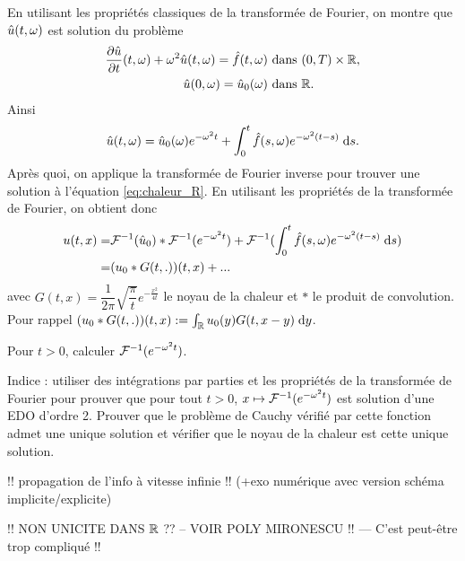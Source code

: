 \documentclass[12pt,a4paper,twoside]{article}
\begin{document}
En utilisant les propri\'et\'es classiques de la transform\'ee de Fourier,
on montre que $\hat u(t,\omega)$ est solution du probl\`eme
\begin{align*}
  \dfrac{\partial \hat u}{\partial t}(t,\omega) + \omega^2 \hat u(t , \omega) = \hat f(t,\omega) 
  & \text{ dans } (0,T) \times \mathbb{R} ,
  \\
  \hat u(0 , \omega) = \hat u_0(\omega)
  & \text{ dans } \mathbb{R} .
\end{align*}
Ainsi 
\begin{align*}
  \hat u(t,\omega) = \hat u_0(\omega) e^{- \omega^2 t} 
  + \int_0^t \hat f(s,\omega) e^{- \omega^2 (t - s)} \;\mathrm{d} s . 
\end{align*}
Apr\`es quoi, on applique la transform\'ee de Fourier inverse pour trouver
une solution \`a l'\'equation \eqref{eq:chaleur_R}.
En utilisant les propri\'et\'es de la transform\'ee de Fourier, on obtient donc
\begin{align*}
  u(t,x) 
  =& \mathcal{F}^{-1}(\hat u_0) * \mathcal{F}^{-1} (e^{-\omega^2 t})
  + \mathcal{F}^{-1} (\int_0^t \hat f(s,\omega) e^{- \omega^2(t-s)} \;\mathrm{d} s)
  \\
  =& (u_0 * G(t,.))(t,x) + ...
\end{align*}
avec $G(t,x) = \dfrac{1}{2 \pi} \sqrt{\dfrac{\pi}{t}} e^{- \frac{x^2}{4t}}$
le noyau de la chaleur et $*$ le produit de convolution.
Pour rappel
$(u_0 * G(t,.))(t,x) := \int_{\mathbb{R}} u_0(y) G(t,x-y) \;\mathrm{d} y$.

\begin{exercise}
  Pour $t > 0$, calculer $\mathcal{F}^{-1}(e^{-\omega^2 t})$.

  Indice : utiliser des int\'egrations par parties et les propri\'et\'es de la transform\'ee
  de Fourier pour prouver que pour tout $t > 0$, $x \mapsto \mathcal{F}^{-1}(e^{-\omega^2 t})$ est solution
  d'une EDO d'ordre 2.
  Prouver que le probl\`eme de Cauchy v\'erifi\'e par cette fonction admet une unique solution
  et v\'erifier que le noyau de la chaleur est cette unique solution.
\end{exercise}



!! propagation de l'info \`a vitesse infinie !!
(+exo num\'erique avec version sch\'ema implicite/explicite)



!! NON UNICITE DANS $\mathbb{R}$ ?? -- VOIR POLY MIRONESCU !! --- C'est peut-\^etre trop compliqu\'e !!
\end{document}
